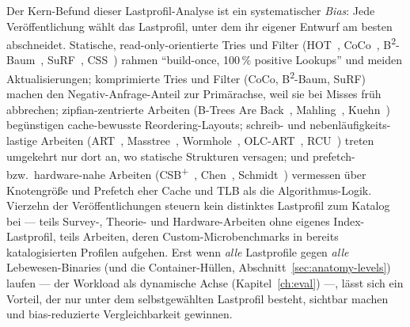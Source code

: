 Der Kern-Befund dieser Lastprofil-Analyse ist ein systematischer \emph{Bias}: Jede Veröffentlichung wählt
das Lastprofil, unter dem ihr eigener Entwurf am besten abschneidet. Statische, read-only-orientierte
Tries und Filter (HOT~\cite{binna2018hot}, CoCo~\cite{boffa2024coco},
B\textsuperscript{2}-Baum~\cite{schmeisser2022b2tree}, SuRF~\cite{zhang2018surf}, CSS~\cite{rao1999css})
rahmen \enquote{build-once, 100\,\% positive Lookups} und meiden Aktualisierungen; komprimierte Tries und
Filter (CoCo, B\textsuperscript{2}-Baum, SuRF) machen den Negativ-Anfrage-Anteil zur Primärachse, weil sie
bei Misses früh abbrechen; zipfian-zentrierte Arbeiten (B-Trees Are Back~\cite{mueller2025btreesback},
Mahling~\cite{mahling2025hotpath}, Kuehn~\cite{kuehn2023bplustree}) begünstigen cache-bewusste
Reordering-Layouts; schreib- und nebenläufigkeits-lastige Arbeiten (ART~\cite{leis2013art},
Masstree~\cite{mao2012masstree}, Wormhole~\cite{wu2019wormhole}, OLC-ART~\cite{leis2016olc},
RCU~\cite{mckenney2001rcu}) treten umgekehrt nur dort an, wo statische Strukturen versagen; und prefetch-
bzw.\ hardware-nahe Arbeiten (CSB\textsuperscript{+}~\cite{rao2000csb}, Chen~\cite{chen2001prefetch},
Schmidt~\cite{schmidt2025hbm}) vermessen über Knotengröße und Prefetch eher Cache und TLB als die
Algorithmus-Logik. Vierzehn der Veröffentlichungen steuern kein distinktes Lastprofil zum Katalog bei ---
teils Survey-, Theorie- und Hardware-Arbeiten ohne eigenes Index-Lastprofil, teils Arbeiten, deren
Custom-Microbenchmarks in bereits katalogisierten Profilen aufgehen. Erst wenn \emph{alle} Lastprofile
gegen \emph{alle} Lebewesen-Binaries (und die Container-Hüllen, Abschnitt~\ref{sec:anatomy-levels})
laufen --- der Workload als dynamische Achse
(Kapitel~\ref{ch:eval}) ---, lässt sich ein Vorteil, der nur unter dem selbstgewählten Lastprofil besteht,
sichtbar machen und bias-reduzierte Vergleichbarkeit gewinnen.

